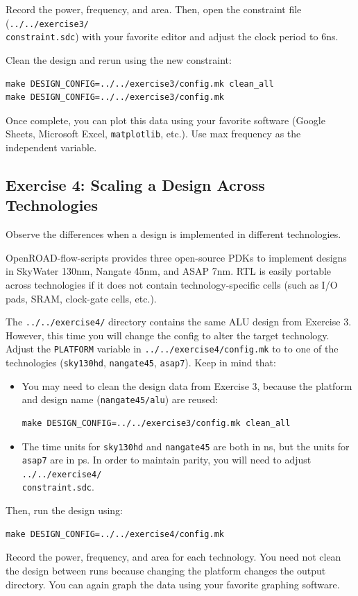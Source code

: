 \documentclass[a4paper,12pt,twoside]{article}
\begin{document}
Record the power, frequency, and area. Then, open the constraint file (\texttt{../../exercise3/\\
constraint.sdc}) with your favorite editor and adjust the clock period to 6ns.

Clean the design and rerun using the new constraint:
\begin{verbatim}
make DESIGN_CONFIG=../../exercise3/config.mk clean_all
make DESIGN_CONFIG=../../exercise3/config.mk
\end{verbatim}

Once complete, you can plot this data using your favorite software (Google Sheets, Microsoft Excel, \texttt{matplotlib}, etc.). Use max frequency as the independent variable.
\subsection{Exercise 4: Scaling a Design Across Technologies}\label{SE4}
Observe the differences when a design is implemented in different technologies.

OpenROAD-flow-scripts provides three open-source PDKs to implement designs in SkyWater 130nm, Nangate 45nm, and ASAP 7nm. RTL is easily portable across technologies if it does not contain technology-specific cells (such as I/O pads, SRAM, clock-gate cells, etc.).

The \texttt{../../exercise4/} directory contains the same ALU design from Exercise 3. However, this time you will change the config to alter the target technology. Adjust the \texttt{PLATFORM} variable in \texttt{../../exercise4/config.mk} to to one of the technologies (\texttt{sky130hd}, \texttt{nangate45}, \texttt{asap7}). Keep in mind that:
\begin{itemize}
    \item You may need to clean the design data from Exercise 3, because the platform and design name (\texttt{nangate45/alu}) are reused:
    \begin{verbatim}
make DESIGN_CONFIG=../../exercise3/config.mk clean_all
    \end{verbatim}
    \item The time units for \texttt{sky130hd} and \texttt{nangate45} are both in ns, but the units for \texttt{asap7} are in ps. In order to maintain parity, you will need to adjust \texttt{../../exercise4/\\
    constraint.sdc}.
\end{itemize}
Then, run the design using:
\begin{verbatim}
make DESIGN_CONFIG=../../exercise4/config.mk
\end{verbatim}
Record the power, frequency, and area for each technology. You need not clean the design between runs because changing the platform changes the output directory. You can again graph the data using your favorite graphing software.
\end{document}
